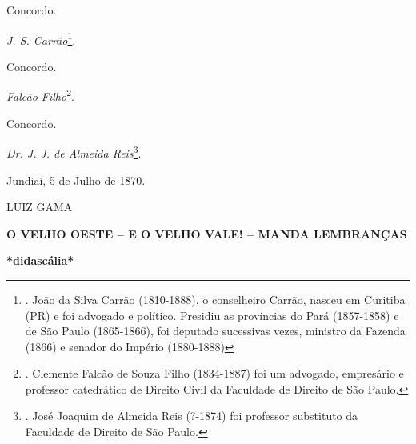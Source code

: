 Concordo.

\emph{J. S. Carrão}\footnote{. João da Silva Carrão (1810-1888), o
  conselheiro Carrão, nasceu em Curitiba (PR) e foi advogado e político.
  Presidiu as províncias do Pará (1857-1858) e de São Paulo (1865-1866),
  foi deputado sucessivas vezes, ministro da Fazenda (1866) e senador do
  Império (1880-1888)}.

Concordo.

\emph{Falcão Filho}\footnote{. Clemente Falcão de Souza Filho
  (1834-1887) foi um advogado, empresário e professor catedrático de
  Direito Civil da Faculdade de Direito de São Paulo.}.

Concordo.

\emph{Dr. J. J. de Almeida Reis}\footnote{. José Joaquim de Almeida Reis
  (?-1874) foi professor substituto da Faculdade de Direito de São
  Paulo.}.

Jundiaí, 5 de Julho de 1870.

LUIZ GAMA

\textbf{O VELHO OESTE -- E O VELHO VALE! -- MANDA LEMBRANÇAS}

\textbf{*didascália*}

